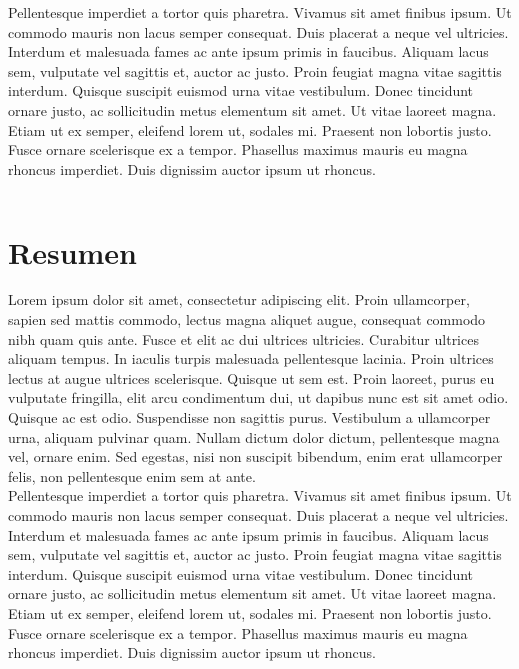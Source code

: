 \documentclass[letterpaper,oneside,openany,11pt]{book}
\begin{document}
Pellentesque imperdiet a tortor quis pharetra. Vivamus sit amet finibus ipsum. Ut commodo mauris non lacus semper consequat. Duis placerat a neque vel ultricies. Interdum et malesuada fames ac ante ipsum primis in faucibus. Aliquam lacus sem, vulputate vel sagittis et, auctor ac justo. Proin feugiat magna vitae sagittis interdum. Quisque suscipit euismod urna vitae vestibulum. Donec tincidunt ornare justo, ac sollicitudin metus elementum sit amet. Ut vitae laoreet magna. Etiam ut ex semper, eleifend lorem ut, sodales mi. Praesent non lobortis justo. Fusce ornare scelerisque ex a tempor. Phasellus maximus mauris eu magna rhoncus imperdiet. Duis dignissim auctor ipsum ut rhoncus.
\thispagestyle{empty} %

\newpage
$\ $
\thispagestyle{empty} %

\chapter*{Resumen} %
\noindent Lorem ipsum dolor sit amet, consectetur adipiscing elit. Proin ullamcorper, sapien sed mattis commodo, lectus magna aliquet augue, consequat commodo nibh quam quis ante. Fusce et elit ac dui ultrices ultricies. Curabitur ultrices aliquam tempus. In iaculis turpis malesuada pellentesque lacinia. Proin ultrices lectus at augue ultrices scelerisque. Quisque ut sem est. Proin laoreet, purus eu vulputate fringilla, elit arcu condimentum dui, ut dapibus nunc est sit amet odio. Quisque ac est odio. Suspendisse non sagittis purus. Vestibulum a ullamcorper urna, aliquam pulvinar quam. Nullam dictum dolor dictum, pellentesque magna vel, ornare enim. Sed egestas, nisi non suscipit bibendum, enim erat ullamcorper felis, non pellentesque enim sem at ante. \\

Pellentesque imperdiet a tortor quis pharetra. Vivamus sit amet finibus ipsum. Ut commodo mauris non lacus semper consequat. Duis placerat a neque vel ultricies. Interdum et malesuada fames ac ante ipsum primis in faucibus. Aliquam lacus sem, vulputate vel sagittis et, auctor ac justo. Proin feugiat magna vitae sagittis interdum. Quisque suscipit euismod urna vitae vestibulum. Donec tincidunt ornare justo, ac sollicitudin metus elementum sit amet. Ut vitae laoreet magna. Etiam ut ex semper, eleifend lorem ut, sodales mi. Praesent non lobortis justo. Fusce ornare scelerisque ex a tempor. Phasellus maximus mauris eu magna rhoncus imperdiet. Duis dignissim auctor ipsum ut rhoncus.
\end{document}
